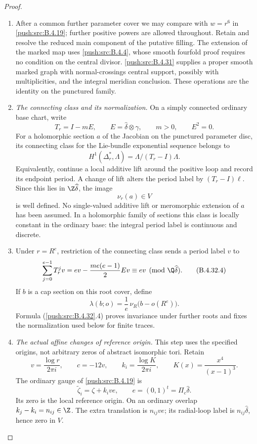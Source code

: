 \begin{proof}
\begin{enumerate}[label=\arabic*.,leftmargin=*]
\item After a common further parameter cover we may compare with
$w=r^6$ in \ref{push:src:B.4.19}; further positive powers are allowed throughout.
Retain and resolve the reduced main component of the putative
filling. The extension of the marked map uses \ref{push:src:B.4.4}, whose
smooth fourfold proof requires no condition on the central
divisor. \ref{push:src:B.4.31} supplies a proper smooth marked graph with
normal-crossings central support, possibly with multiplicities,
and the integral meridian conclusion. These operations are
the identity on the punctured family.

\item \emph{The connecting class and its normalization.}
On a simply connected ordinary base chart, write
\[
 T_r=I-mE,\qquad
 E=\widehat\delta\otimes\gamma,\qquad m>0,\qquad E^2=0.
 \tag{B.4.32.2}
\]
For a holomorphic section $a$ of the Jacobian on the punctured
parameter disc, its connecting class for the Lie-bundle
exponential sequence belongs to
\[
 H^1(\Delta_r^*,\Lambda)
       =\Lambda/(T_r-I)\Lambda .
\]
Equivalently, continue a local additive lift around the positive
loop and record its endpoint period. A change of lift alters
the period label by $(T_r-I)\ell$. Since this lies in
$\Z\widehat\delta$, the image
\[
 \nu_r(a)\in V
 \tag{B.4.32.3}
\]
is well defined. No single-valued additive lift or meromorphic
extension of $a$ has been assumed. In a holomorphic family of
sections this class is locally constant in the ordinary base:
the integral period label is continuous and discrete.

\item Under $r=R^e$, restriction of the connecting class sends a
period label $v$ to
\[
 \sum_{j=0}^{e-1}T_r^jv
   =ev-\frac{me(e-1)}2Ev
   \equiv ev\pmod{\Q\widehat\delta}.
 \tag{B.4.32.4}
\]
If $b$ is a cap section on this root cover, define
\[
 \lambda(b;o)=\frac1e\,\nu_R\bigl(b-o(R^e)\bigr).
 \tag{B.4.32.5}
\]
Formula (\ref{push:src:B.4.32}.4) proves invariance under further roots and
fixes the normalization used below for finite traces.

\item \emph{The actual affine changes of reference origin.}
This step uses the specified origins, not arbitrary zeros of
abstract isomorphic tori. Retain
\[
 v=\frac{\log r}{2\pi i},\qquad c=-12v,\qquad
 k_i=\frac{\log K}{2\pi i},\qquad
 K(x)=\frac{x^4}{(x-1)^3}.
\]
The ordinary gauge of \ref{push:src:B.4.19} is
\[
 \widetilde\zeta_i=\zeta+k_i v e,\qquad
 e=(0,1)^t=\Pi_c\widehat\delta .
 \tag{B.4.32.6}
\]
Its zero is the local reference origin. On an ordinary overlap
$k_j-k_i=n_{ij}\in\Z$. The extra translation is $n_{ij}ve$;
its radial-loop label is $n_{ij}\widehat\delta$, hence zero
in $V$.


\end{enumerate}
\end{proof}
